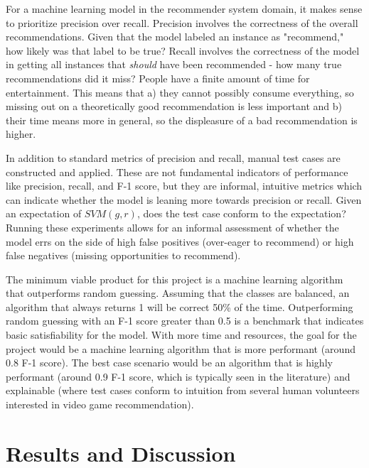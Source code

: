 \documentclass[10pt,twocolumn]{article}
\begin{document}
For a machine learning model in the recommender system domain, it makes sense to prioritize precision over recall. Precision involves the correctness of the overall recommendations. Given that the model labeled an instance as "recommend," how likely was that label to be true? Recall involves the correctness of the model in getting all instances that \textit{should} have been recommended - how many true recommendations did it miss? People have a finite amount of time for entertainment. This means that a) they cannot possibly consume everything, so missing out on a theoretically good recommendation is less important and b) their time means more in general, so the displeasure of a bad recommendation is higher. 

In addition to standard metrics of precision and recall, manual test cases are constructed and applied. These are not fundamental indicators of performance like precision, recall, and F-1 score, but they are informal, intuitive metrics which can indicate whether the model is leaning more towards precision or recall. Given an expectation of $SVM(g, r)$, does the test case conform to the expectation? Running these experiments allows for an informal assessment of whether the model errs on the side of high false positives (over-eager to recommend) or high false negatives (missing opportunities to recommend).

The minimum viable product for this project is a machine learning algorithm that outperforms random guessing. Assuming that the classes are balanced, an algorithm that always returns 1 will be correct 50\% of the time. Outperforming random guessing with an F-1 score greater than 0.5 is a benchmark that indicates basic satisfiability for the model. With more time and resources, the goal for the project would be a machine learning algorithm that is more performant (around 0.8 F-1 score). The best case scenario would be an algorithm that is highly performant (around 0.9 F-1 score, which is typically seen in the literature) and explainable (where test cases conform to intuition from several human volunteers interested in video game recommendation).

\section{Results and Discussion}

\end{document}
